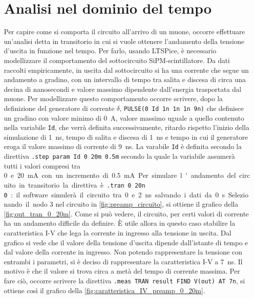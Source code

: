 \section{Analisi nel dominio del tempo}
Per capire come si comporta il circuito all'arrivo di un muone, occorre effettuare un'analisi detta in transitorio in cui si vuole ottenere 
l'andamento della tensione d'uscita in funzione nel tempo. Per farlo, usando LTSPice, è necessario modellizzare il comportamento del sottocircuito 
SiPM-scintillatore. Da dati raccolti empiricamente, in uscita dal sottocircuito si ha una corrente che segue un andamento a gradino, con un 
intervallo di tempo tra salita e discesa di circa una decina di nanosecondi e valore massimo dipendente dall'energia trasportata dal muone. 
Per modellizzare questo comportamento occorre scrivere, dopo la definizione del generatore di corrente $\delta$, \texttt{PULSE(0 {Id} 1n 1n 1n 9n)} 
che definisce un gradino con valore minimo di \SI{0}{\ampere}, valore massimo uguale a quello contenuto nella variabile \texttt{Id}, che verrà 
definita successivamente, ritardo rispetto l'inizio della simulazione di \SI{1}{\nano\second}, tempo di salita e discesa di \SI{1}{\nano\second} e 
tempo in cui il generatore eroga il valore massimo di corrente di \SI{9}{\nano\second}. La varabile \texttt{Id} è definita secondo la direttiva 
\texttt{.step param Id 0 20m 0.5m} secondo la quale la variabile assumerà tutti i valori compresi tra \SI{0} e \SI{20}{\milli\ampere} con 
un incremento di \SI{0,5}{\milli\ampere}. Per simulare l'andamento del circuito in transitorio la direttiva è \texttt{.tran 0 20n 0}: il software 
simulerà il circuito tra \SI{0} e \SI{2}{\nano\second} salvando i dati da \SI{0}{\second}. Selezionando il nodo $3$ nel circuito in 
\autoref*{fig:preamp_circuito}, si ottiene il grafico della \autoref*{fig:out_tran_0_20m}. Come si può vedere, il circuito, per certi 
valori di corrente ha un andamento difficile da definire. È utile allora in questo caso stabilire la caratteristica I-V che lega la corrente in 
ingresso alla tensione in uscita. Dal grafico si vede che il valore della tensione d'uscita dipende dall'istante di tempo e dal valore della 
corrente in ingresso. Non potendo rappresentare la tensione con entrambi i parametri, si è deciso di rappresentare la caratteristica I-V a \SI{7}{\nano\second}. 
Il motivo è che il valore si trova circa a metà del tempo di corrente massima. Per fare ciò,
occorre scrivere la direttiva \texttt{.meas TRAN result FIND V(out) AT 7n}, si ottiene così il grafico della \autoref*{fig:caratteristica_IV_preamp_0_20m}.
